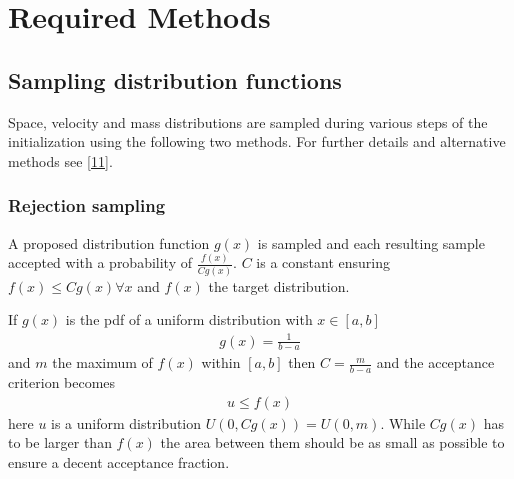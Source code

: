 \documentclass[letterpaper,10pt,english]{sphinxmanual}
\begin{document}
	\section{Required Methods}
		\subsection{Sampling distribution functions}
			\label{\detokenize{NBodySimulation/Initialization:sampling-distribution-functions}}
			Space, velocity and mass distributions are sampled during various steps of the initialization using the following two methods.
			For further details and alternative methods see {[}\hyperlink{cite.NBodySimulation/Appendix:id43}{11}{]}.
				\subsubsection{Rejection sampling}
					\label{\detokenize{NBodySimulation/Initialization:rejection-sampling}}
					\sphinxAtStartPar
					A proposed distribution function \(g(x)\) is sampled and each resulting sample accepted with a probability of \(\frac{f(x)}{Cg(x)}\).
					\(C\) is a constant ensuring \(f(x)\leqslant Cg(x) \forall x\) and \(f(x)\) the target distribution.
			
					\sphinxAtStartPar
					If \(g(x)\) is the pdf of a uniform distribution with \(x \in \left [ a,b \right ]\)
					\begin{equation*}
					\begin{split}g(x)=\frac{1}{b-a}\end{split}
					\end{equation*}
					\sphinxAtStartPar
					and \(m\) the maximum of \(f(x)\) within \(\left [ a,b \right ]\) then \(C=\frac{m}{b-a}\) and the acceptance criterion becomes
					\begin{equation*}
					\begin{split}u \leq f(x)\end{split}
					\end{equation*}
					\sphinxAtStartPar
					here \(u\) is a uniform distribution \(U(0,Cg(x)) = U(0,m)\). While \(Cg(x)\) has to be larger than \(f(x)\) the area between them should be as small as possible to ensure a decent acceptance fraction.
				
\end{document}
